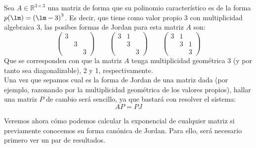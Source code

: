 \begin{ejemplo}
    Sea $A\in \mathbb{R}^{3\times 3}$ una matriz de forma que su polinomio característico es de la forma $p(\lm) = {(\lm-3)}^{3}$. Es decir, que tiene como valor propio 3 con multiplicidad algebraica 3, las posibes formas de Jordan para esta matriz $A$ son:
    \begin{equation*}
        \left(\begin{array}{ccc}
                3 & & \\
                  &3  & \\
                  &  &3 
        \end{array}\right) \qquad 
        \left(\begin{array}{ccc}
                3 & 1& \\
                  &3  & \\
                  &  &3 
        \end{array}\right)\qquad 
        \left(\begin{array}{ccc}
                3 & 1& \\
                  &3  & 1 \\
                  &  &3 
        \end{array}\right)
    \end{equation*}
    Que se corresponden con que la matriz $A$ tenga multiplicidad geométrica 3 (y por tanto sea diagonalizable), 2 y 1, respectivamente.\\

    Una vez que sepamos cual es la forma de Jordan de una matriz dada (por ejemplo, razonando por la multiplicidad geométrica de los valores propios), hallar una matriz $P$ de cambio será sencillo, ya que bastará con resolver el sistema:
    \begin{equation*}
        AP = PJ
    \end{equation*}
\end{ejemplo}

Veremos ahora cómo podemos calcular la exponencial de cualquier matriz si previamente conocemos su forma canónica de Jordan. Para ello, será necesario primero ver un par de resultados.

